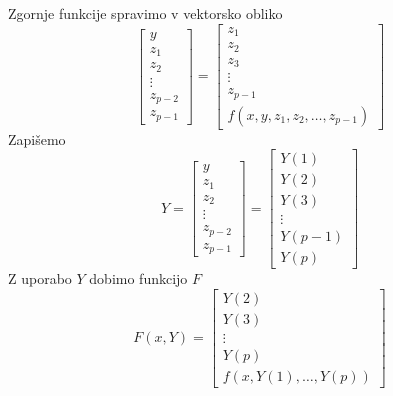 \documentclass[a4paper,12pt]{article}
\theoremstyle{definition}
\theoremstyle{remark}
\begin{document}
Zgornje funkcije spravimo v vektorsko obliko
\begin{equation*}
    \begin{bmatrix}
        y \\
        z_1 \\
        z_2 \\
        \vdots \\
        z_{p-2} \\
        z_{p-1}
    \end{bmatrix}
    =
    \begin{bmatrix}
        z_1 \\
        z_2 \\
        z_3 \\
        \vdots \\
        z_{p-1} \\
        f(x, y, z_1, z_2, \dots, z_{p-1})
    \end{bmatrix}
\end{equation*}
Zapišemo
\begin{equation*}
    Y = \begin{bmatrix}
        y \\
        z_1 \\
        z_2 \\
        \vdots \\
        z_{p-2} \\
        z_{p-1}
    \end{bmatrix}
    =
    \begin{bmatrix}
        Y(1) \\
        Y(2) \\
        Y(3) \\
        \vdots \\
        Y(p-1) \\
        Y(p)
    \end{bmatrix}
\end{equation*}
Z uporabo $Y$ dobimo funkcijo $F$
\begin{equation*}
    F(x, Y) = \begin{bmatrix}
        Y(2) \\
        Y(3) \\
        \vdots \\
        Y(p) \\
        f(x, Y(1), \dots, Y(p))
    \end{bmatrix}
\end{equation*}
\end{document}

